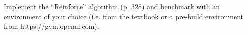 
\begin{exercise}

\phantom{}

Implement the ``Reinforce'' algorithm (p. 328) and benchmark with an
environment of your choice (i.e. from the textbook or a pre-build
environment from https://gym.openai.com).

\end{exercise}


\begin{solution}

\phantom{}

\end{solution}

